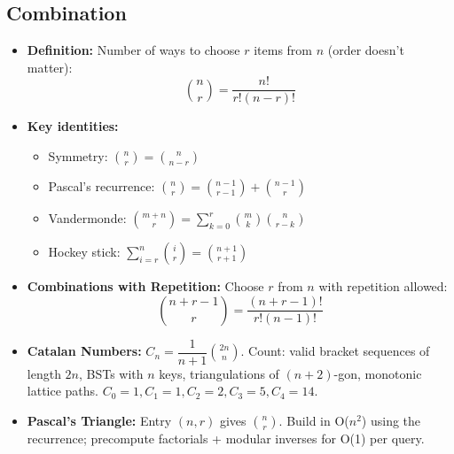 \subsection{Combination}

\begin{itemize}
    \item \textbf{Definition: } Number of ways to choose $r$ items from $n$ (order doesn't matter):
          $$ \binom{n}{r} = \frac{n!}{r!(n-r)!} $$

    \item \textbf{Key identities: }
          \begin{itemize}
              \item Symmetry: $\binom{n}{r} = \binom{n}{n-r}$
              \item Pascal's recurrence: $\binom{n}{r} = \binom{n-1}{r-1} + \binom{n-1}{r}$
              \item Vandermonde: $\binom{m+n}{r} = \sum_{k=0}^{r} \binom{m}{k}\binom{n}{r-k}$
              \item Hockey stick: $\sum_{i=r}^{n} \binom{i}{r} = \binom{n+1}{r+1}$
          \end{itemize}

    \item \textbf{Combinations with Repetition: } Choose $r$ from $n$ with repetition allowed:
          $$ \binom{n + r - 1}{r} = \frac{(n + r - 1)!}{r!(n - 1)!} $$

    \item \textbf{Catalan Numbers: } $C_n = \dfrac{1}{n+1}\binom{2n}{n}$. Count: valid bracket sequences of length $2n$, BSTs with $n$ keys, triangulations of $(n+2)$-gon, monotonic lattice paths. $C_0=1, C_1=1, C_2=2, C_3=5, C_4=14$.

    \item \textbf{Pascal's Triangle: } Entry $(n, r)$ gives $\binom{n}{r}$. Build in O($n^2$) using the recurrence; precompute factorials + modular inverses for O(1) per query.
\end{itemize}
